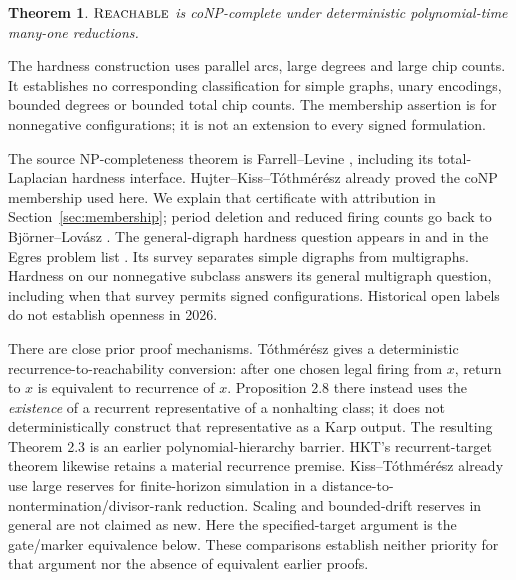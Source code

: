 \documentclass[11pt]{article}
\newtheorem{theorem}{Theorem}
\newcommand{\reach}{\textsc{Reachable}}
\begin{document}
\begin{theorem}\label{thm:main}
$\reach$ is coNP-complete under deterministic polynomial-time many-one
reductions.
\end{theorem}
The hardness construction uses parallel arcs, large degrees and large
chip counts. It establishes no corresponding classification for simple
graphs, unary encodings, bounded degrees or bounded total chip counts.
The membership assertion is for nonnegative configurations; it is not an
extension to every signed formulation.

The source NP-completeness theorem is Farrell--Levine
\cite[Corollary 3.2]{FL}, including its total-Laplacian hardness interface.
Hujter--Kiss--T\'othm\'er\'esz \cite[Theorem 12]{HKT} already proved the
coNP membership used here. We explain that certificate with attribution
in Section~\ref{sec:membership}; period deletion and reduced firing
counts go back to Bj\"orner--Lov\'asz \cite{BL}. The general-digraph
hardness question appears in \cite[Problem 19, arXiv v4]{HKT} and in the
Egres problem list \cite{Egres}. Its survey separates simple digraphs
from multigraphs. Hardness on our nonnegative subclass answers its
general multigraph question, including when that survey permits signed
configurations. Historical open labels do not establish openness in 2026.

There are close prior proof mechanisms. T\'othm\'er\'esz
\cite[Claim 2.4]{T} gives a deterministic recurrence-to-reachability
conversion: after one chosen legal firing from $x$, return to $x$ is
equivalent to recurrence of $x$. Proposition 2.8 there instead uses the
\emph{existence} of a recurrent representative of a nonhalting class;
it does not deterministically construct that representative as a Karp
output. The resulting Theorem 2.3 is an earlier polynomial-hierarchy
barrier. HKT's recurrent-target theorem \cite[Theorem 14]{HKT} likewise
retains a material recurrence premise. Kiss--T\'othm\'er\'esz
\cite[Section 4]{KT} already use large reserves for finite-horizon
simulation in a distance-to-nontermination/divisor-rank reduction.
Scaling and bounded-drift reserves in general are not claimed as new.
Here the specified-target argument is the gate/marker equivalence below.
These comparisons establish neither priority for that argument nor the
absence of equivalent earlier proofs.
\end{document}
